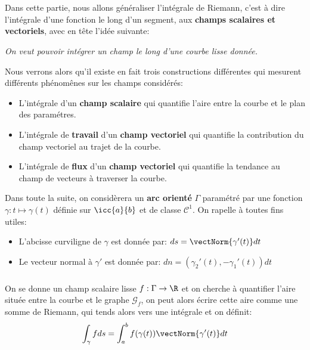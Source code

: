 \chapter*{}
\chapter*{}

Dans cette partie, nous allons généraliser l'intégrale de Riemann, c'est à dire l'intégrale d'une fonction le long d'un segment, aux \textbf{champs scalaires et vectoriels}, avec en tête l'idée suivante:
\begin{center}
   \textit{On veut pouvoir intégrer un champ le long d'une courbe lisse donnée.}
\end{center}
Nous verrons alors qu'il existe en fait trois constructions différentes qui mesurent différents phénomênes sur les champs considérés:
\begin{itemize}
   \item L'intégrale d'un \textbf{champ scalaire} qui quantifie l'aire entre la courbe et le plan des paramétres.
   \item L'intégrale de \textbf{travail} d'un \textbf{champ vectoriel} qui quantifie la contribution du champ vectoriel au trajet de la courbe.
   \item L'intégrale de \textbf{flux} d'un \textbf{champ vectoriel} qui quantifie la tendance au champ de vecteurs à traverser la courbe.
\end{itemize}
Dans toute la suite, on considèrera un \textbf{arc orienté} \(\Gamma\) paramétré par une fonction \(\gamma : t \mapsto \gamma(t)\) définie sur \(\icc{a}{b}\) et de classe \(\mathcal{C}^1\). On rapelle à toutes fins utiles:
\begin{itemize}
   \item L'abcisse curviligne de \(\gamma\) est donnée par: \(ds = \vectNorm{\gamma'(t)} d t  \)
   \item Le vecteur normal à \(\gamma'\) est donnée par: \(dn = (\gamma_2'(t), -\gamma_1'(t))d t  \)
\end{itemize}
\subsection*{}
On se donne un champ scalaire lisse \(f : \Gamma \rightarrow \R\) et on cherche à quantifier l'aire située entre la courbe et le graphe \(\mathscr{G}_f\), on peut alors écrire cette aire comme une somme de Riemann, qui tends alors vers une intégrale et on définit:
\[
   \int_{\gamma} f d s = \int_{a}^{b}f(\gamma(t))\vectNorm{\gamma'(t)}d t
\]
